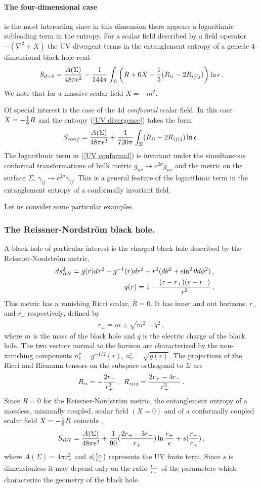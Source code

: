 \documentclass[12pt]{article}
\def\be{\begin{eqnarray}}
\def\ee{\end{eqnarray}}
\def\lb{\label}
\def\o{\over}
\begin{document}
\paragraph*{The four-dimensional case} is the most interesting since in this dimension there appears a logarithmic subleading term in the entropy. For a scalar field described by a field operator $-(\nabla^2+X)$ the UV divergent
terms in the entanglement entropy of a generic $4$-dimensional black hole read \cite{Solodukhin:1994st}
\be
S_{d=4}={A(\Sigma)\o 48\pi\epsilon^2}-{1\o 144\pi}\int_\Sigma \left({R}+6X-{1\o 5}({R}_{ii}-2{R}_{ijij})\right)\ln\epsilon\, .
\lb{UV divergence}
\ee
We note that for a massive scalar field $X=-m^2$. 

Of special interest is the case of the 4d {\it conformal} scalar field. In this case $X=-{1\o 6}{R}$ and the entropy (\ref{UV divergence}) takes the form 
\be
S_{conf}={A(\Sigma)\o 48\pi\epsilon^2}+{1\o 720\pi}\int_\Sigma ({R}_{ii}-2{R}_{ijij})\ln\epsilon\, .
\lb{UV conformal}
\ee
The logarithmic term in (\ref{UV conformal}) is invariant under the simultaneous  conformal transformations of bulk metric $g_{\mu\nu}\rightarrow e^{2\sigma}g_{\mu\nu}$ and the metric on the surface $\Sigma$, $\gamma_{ij}\rightarrow e^{2\sigma}\gamma_{ij}$. This is a general feature of the logarithmic term in the entanglement entropy of a conformally invariant field.

\medskip

Let us consider some particular examples.

\subsubsection{The Reissner-Nordstr\"{o}m black hole.}
A black hole of particular interest is the charged black hole described by the Reissner-Nordstr\"{o}m metric,
\be
&&ds^2_{RN}=g(r)d\tau^2+g^{-1}(r)dr^2+r^2(d\theta^2+\sin^2\theta d\phi^2)\, , \nonumber \\
&&g(r)=1-{(r-r_+)(r-r_-)\o r^2}\, .
\lb{metric-RN}
\ee
This metric has a vanishing Ricci scalar, $\bar{R}=0$. It has inner and out horizons, $r_-$ and $r_+$ respectively, defined by
\be
r_\pm=m\pm \sqrt{m^2-q^2}\, ,
\lb{inner-outer-horizon}
\ee
where $m$ is the mass of the black hole and $q$ is the electric charge of the black hole. The two vectors normal to the horizon are characterized by the non-vanishing components
$n_1^\tau=g^{-1/2}(r)$, $n_2^r=\sqrt{g(r)}$. The projections of the Ricci and Riemann tensors on the subspace orthogonal to $\Sigma$ 
are
\be
{R}_{ii}=-{2r_-\over r^3_+}\, , \,\, \, {R}_{ijij}={2r_+-4r_-\over r_+^3}\, .
\lb{Ricci-Riemann}
\ee
Since ${R}=0$ for the Reissner-Nordstr\"{o}m metric, the entanglement entropy of a massless, minimally coupled,  scalar field $(X=0)$ and of a conformally coupled scalar field $X=-{1\o 6}{R}$ coincide \cite{Solodukhin:1994st},
\be
S_{RN}={A(\Sigma)\o 48\pi\epsilon^2}+{1\o 90}({2r_+-3r_-\o r_+})\ln{r_+\o\epsilon}+s({r_-\o r_+})\, ,
\lb{entropy-RN}
\ee
where $A(\Sigma)=4\pi r_+^2$ and $s({r_-\o r_+})$ represents the UV finite term. 
Since $s$ is dimensionless it may depend only on the ratio ${r_-\o r_+}$ of the parameters which characterize the geometry of the black hole.
\end{document}
